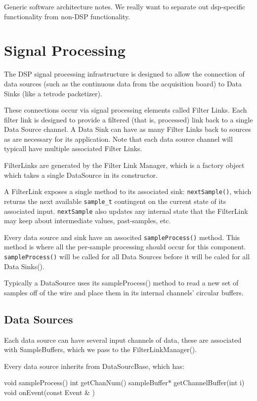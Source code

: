 Generic software architecture notes. We really want to separate out
dsp-specific functionality from non-DSP functionality.


\section{Signal Processing}

The DSP signal processing infrastructure is designed to allow the
connection of data sources (such as the continuous data from the
acquisition board) to Data Sinks (like a tetrode packetizer).

These connections occur via signal processing elements called Filter
Links. Each filter link is designed to provide a filtered (that is,
processed) link back to a single Data Source channel.  A Data Sink can
have as many Filter Links back to sources as are necessary for its
application. Note that each data source channel will typicall have
multiple associated Filter Links.

FilterLinks are generated by the Filter Link Manager, which is a
factory object which takes a single DataSource in its
constructor.

A FilterLink exposes a single method to its associated sink:
\texttt{nextSample()}, which returns the next available
\texttt{sample\_t} contingent on the current state of its associated
input.  \texttt{nextSample} also updates any internal state that the
FilterLink may keep about intermediate values, past-samples, etc.

Every data source and sink have an associted \texttt{sampleProcess()}
method.  This method is where all the per-sample processing should
occur for this component. \texttt{sampleProcess()} will be called for
all Data Sources before it will be caled for all Data Sinks().

Typically a DataSource uses its sampleProcess() method to read a new
set of samples off of the wire and place them in its internal
channels' circular buffers.

\subsection{Data Sources}
Each data source can have several input channels of data, these are
associated with SampleBuffers, which we pass to the
FilterLinkManager().

Every data source inherits from DataSourcBase, which has:

void sampleProcess()
int getChanNum()
sampleBuffer* getChannelBuffer(int i)
void onEvent(const Event & )

